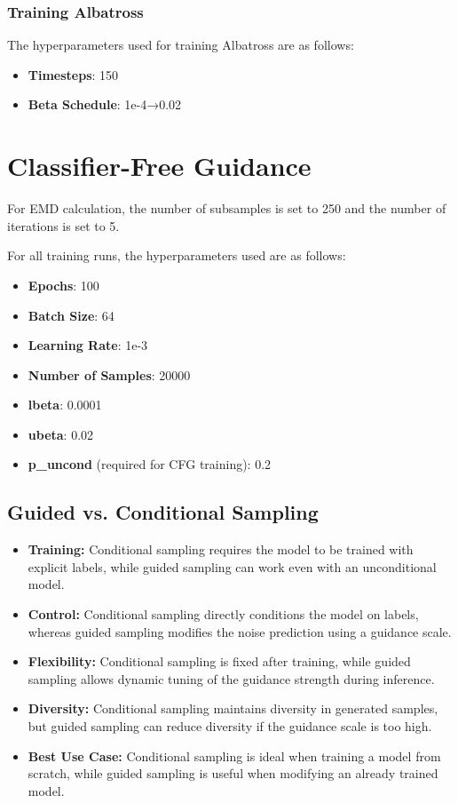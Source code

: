 \documentclass[11pt]{article}
\begin{document}
\subsubsection{Training Albatross}
The hyperparameters used for training Albatross are as follows:
\begin{itemize}
    \item \textbf{Timesteps}: 150
    \item \textbf{Beta Schedule}: 1e-4→0.02
\end{itemize}

\section{Classifier-Free Guidance}

For EMD calculation, the number of subsamples is set to 250 and the number of iterations is set to 5.

For all training runs, the hyperparameters used are as follows:
\begin{itemize}
    \item \textbf{Epochs}: 100
    \item \textbf{Batch Size}: 64
    \item \textbf{Learning Rate}: 1e-3
    \item \textbf{Number of Samples}: 20000
    \item \textbf{lbeta}: 0.0001
    \item \textbf{ubeta}: 0.02
    \item \textbf{p\_uncond} (required for CFG training): 0.2
\end{itemize}

\subsection{Guided vs. Conditional Sampling}

\begin{itemize}
    \item \textbf{Training:} Conditional sampling requires the model to be trained with explicit labels, while guided sampling can work even with an unconditional model.
    
    \item \textbf{Control:} Conditional sampling directly conditions the model on labels, whereas guided sampling modifies the noise prediction using a guidance scale.
    
    \item \textbf{Flexibility:} Conditional sampling is fixed after training, while guided sampling allows dynamic tuning of the guidance strength during inference.
    
    \item \textbf{Diversity:} Conditional sampling maintains diversity in generated samples, but guided sampling can reduce diversity if the guidance scale is too high.
    
    \item \textbf{Best Use Case:} Conditional sampling is ideal when training a model from scratch, while guided sampling is useful when modifying an already trained model.
\end{itemize}
\end{document}
